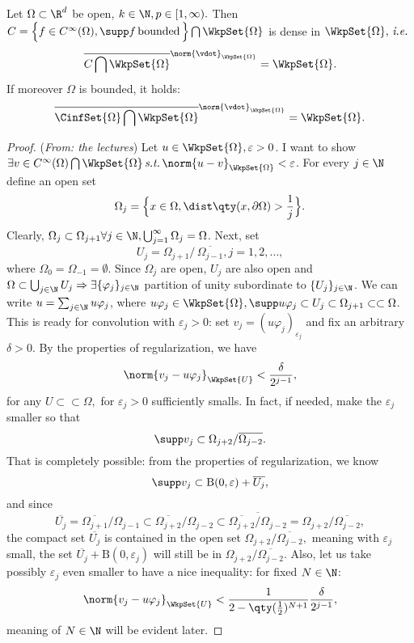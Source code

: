 \begin{theorem}
	Let $\Omega \subset \R^d$ be open, $k \in \N, p \in [1,\infty).$ Then $C = \Big\{ f \in C^\infty(\Omega), \supp f \, \text{bounded} \,\Big\} \bigcap \WkpSet{\Omega}$ is dense in $\WkpSet{\Omega}, \, \text{\textit{i.e.}} \,$
	\[
		\overline{C \bigcap \WkpSet{\Omega}}^{\norm{\vdot}_{\WkpSet{\Omega}}} = \WkpSet{\Omega}.
	\]
	If moreover $\Omega$ is bounded, it holds:
	\[
		\overline{\CinfSet{\Omega}\bigcap \WkpSet{\Omega}}^{\norm{\vdot}_{\WkpSet{\Omega}}} = \WkpSet{\Omega}.
	\]
\end{theorem}
\begin{proof}(\textit{From: the lectures})
	Let $u \in \WkpSet{\Omega}, \varepsilon >0$. I want to show $\exists v \in C^\infty(\Omega) \bigcap \WkpSet{\Omega} \, \text{\textit{s.t.}} \, \norm{u-v}_{\WkpSet{\Omega}} < \varepsilon$.
For every $j \in \N$ define an open set
	\[
		\Omega_j = \Big\{ x \in \Omega, \dist\qty(x,\partial \Omega) > \frac{1}{j}\Big\}.
	\]
	Clearly, $\Omega_j \subset \Omega_{j+1} \forall j \in \N, \bigcup_{j=1}^\infty \Omega_j =\Omega$. Next, set
	\[
		U_j = \Omega_{j+1} /\,  \overline{\Omega_{j-1}}, j=1,2, \dots,
	\]
	where $\Omega_0 = \Omega_{-1} = \emptyset$. Since $\Omega_j$ are open, $U_j$ are also open and $\Omega \subset \bigcup_{j \in \N}U_j  \Rightarrow \exists \{\varphi_j\}_{j\in \N} $ partition of unity subordinate to $\{U_j\}_{j \in \N}$. We can write $u = \sum_{j \in \N} u \varphi_j$, where $u \varphi_j \in \WkpSet{\Omega}, \supp u \varphi_j \subset U_j \subset \Omega_{j+1} \subset \subset \Omega$. This is ready for convolution with $\varepsilon_j >0$: set $ v_j = (u \varphi_j)_{\varepsilon_j}$ and fix an arbitrary $\delta>0.$ By the properties of regularization, we have
	\[
		\norm{v_j - u \varphi_j }_{\WkpSet{U}} < \frac{\delta}{2^{j-1}},
	\]
	for any $U \subset \subset \Omega,$ for $\varepsilon_j > 0$ sufficiently smalls. In fact, if needed, make the $\varepsilon_j$ smaller so that
	\[
		\supp v_j \subset \Omega_{j+2}/ \overline{\Omega_{j-2}}.
	\]
	That is completely possible: from the properties of regularization, we know
	\[
		\supp v_j \subset \text{B}(0,\varepsilon)+ \overline{U_j},
	\]
	and since
	\[
		\overline{U_j} = \overline{\Omega_{j+1}}/\Omega_{j-1} \subset \overline{\Omega_{j+2}}/\Omega_{j-2} \subset \overline{\overline{\Omega_{j+2}}/\Omega_{j-2}} = \Omega_{j+2}/ \overline{\Omega_{j-2}},
	\]
	the compact set $\overline{U_j}$ is contained in the open set $\Omega_{j+2}/ \overline{\Omega_{j-2}},$ meaning with $\varepsilon_j$ small, the set $\overline{U_j} + \text{B}(0,\varepsilon_j)$ will still be in $\Omega_{j+2}/ \overline{\Omega_{j-2}}.$ Also, let us take possibly $\varepsilon_j$ even smaller to have a nice inequality: for fixed $N \in \N$:
	\[
		\norm{v_j - u \varphi_j}_{\WkpSet{U}} < \frac{1}{2-\qty(\frac{1}{2})^{N+1}} \frac{\delta}{2^{j-1}},
	\]
	meaning of $N \in \N$ will be evident later. 



\end{proof}
